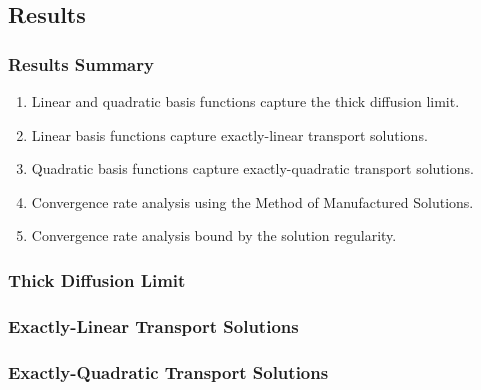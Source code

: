 \documentclass[compress,10pt]{beamer}
\begin{document}
\subsection{Results}
\begin{frame}[t]\frametitle{Results Summary}
\begin{block}{}
\begin{enumerate}
\item Linear and quadratic basis functions capture the thick diffusion limit.
\item Linear basis functions capture exactly-linear transport solutions.
\item Quadratic basis functions capture exactly-quadratic transport solutions.
\item Convergence rate analysis using the Method of Manufactured Solutions. 
\item Convergence rate analysis bound by the solution regularity.
\end{enumerate}
\end{block}
\end{frame}
\begin{frame}[t]\frametitle{Thick Diffusion Limit}

\end{frame}
\begin{frame}[t]\frametitle{Exactly-Linear Transport Solutions}

\end{frame}
\begin{frame}[t]\frametitle{Exactly-Quadratic Transport Solutions}

\end{frame}
\end{document}
